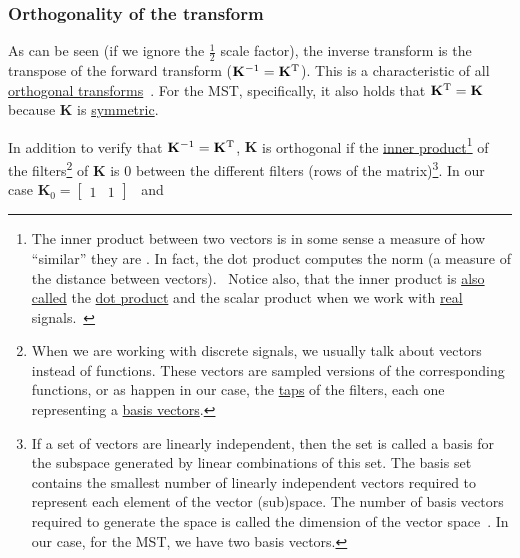 \subsubsection{Orthogonality of the transform}
As can be seen (if we ignore the $\frac{1}{2}$ scale factor),
the inverse transform is the transpose of the forward transform
(${\mathbf K}^{-1}={\mathbf K}^{\text T}$). This is a characteristic
of all
\href{https://en.wikipedia.org/wiki/Orthogonal_transformation}{orthogonal
  transforms}~\cite{sayood2017introduction}. For the MST,
specifically, it also holds that ${\mathbf K}^{\text T}={\mathbf K}$
because ${\mathbf K}$ is
\href{https://en.wikipedia.org/wiki/Symmetric_matrix}{symmetric}.

In addition to verify that ${\mathbf K}^{-1}={\mathbf K}^{\text T}$,
${\mathbf K}$ is orthogonal if the
\href{https://en.wikipedia.org/wiki/Inner_product_space}{inner
  product}\footnote{The inner product between two vectors is in some
  sense a measure of how ``similar'' they are
  \cite{sayood2017introduction}. In fact, the dot product computes the
  norm (a measure of the distance between
  vectors).~\cite{vetterli2014foundations} Notice also, that the inner
  product is
  \href{https://math.stackexchange.com/questions/476738/difference-between-dot-product-and-inner-product}{also
    called} the \href{https://en.wikipedia.org/wiki/Dot_product}{dot
    product} and the scalar product when we work with
  \href{https://en.wikipedia.org/wiki/Real_number}{real}
  signals.~\cite{vetterli2014foundations}} of the
filters\footnote{When we are working with discrete signals, we usually
  talk about vectors instead of functions. These vectors are sampled
  versions of the corresponding functions, or as happen in our case,
  the
  \href{https://en.wikipedia.org/wiki/Finite_impulse_response}{taps}
  of the filters, each one representing a
  \href{https://en.wikipedia.org/wiki/Basis_(linear_algebra)}{basis
    vectors}.} of ${\mathbf K}$ is $0$ between the different filters
(rows of the matrix)\footnote{If a set of vectors are linearly
  independent, then the set is called a basis for the subspace
  generated by linear combinations of this set. The basis set contains
  the smallest number of linearly independent vectors required to
  represent each element of the vector (sub)space. The number of basis
  vectors required to generate the space is called the dimension of
  the vector space~\cite{sayood2017introduction}. In our case, for the
  MST, we have two basis vectors.}. In our case
${\mathbf K}_0=\begin{bmatrix}1 & 1\end{bmatrix}$~ and
